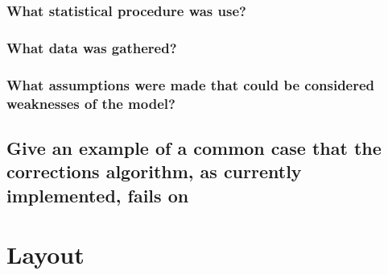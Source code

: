\documentclass[]{article}
\begin{document}
\subsubsection{What statistical procedure was use?}
\subsubsection{What data was gathered?}
\subsubsection{What assumptions were made that could be considered weaknesses of the model?}
\subsection{Give an example of a common case that the corrections algorithm, as currently implemented, fails on}

\section{Layout}

\end{document}
